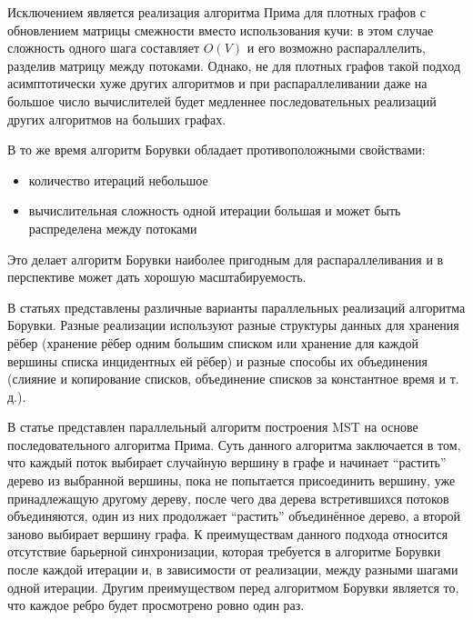 \documentclass[a4paper,10pt]{extarticle}
\begin{document}
Исключением является реализация алгоритма Прима для плотных графов с обновлением матрицы смежности вместо использования кучи: в этом случае сложность одного шага составляет $O(V)$ и его возможно распараллелить, разделив матрицу между потоками.
Однако, не для плотных графов такой подход асимптотически хуже других алгоритмов и при распараллеливании даже на большое число вычислителей будет медленнее последовательных реализаций других алгоритмов на больших графах.

В то же время алгоритм Борувки обладает противоположными свойствами:
\begin{itemize}
	\item количество итераций небольшое
	\item вычислительная сложность одной итерации большая и может быть распределена между потоками
\end{itemize}
Это делает алгоритм Борувки наиболее пригодным для распараллеливания и в перспективе может дать хорошую масштабируемость.

В статьях \cite{dense-mst,boruvka-prima,boruvka-cm5} представлены различные варианты параллельных реализаций алгоритма Борувки.
Разные реализации используют разные структуры данных для хранения рёбер (хранение рёбер одним большим списком или хранение для каждой вершины списка инцидентных ей рёбер) и разные способы их объединения (слияние и копирование списков, объединение списков за константное время и т. д.).

В статье \cite{boruvka-prima} представлен параллельный алгоритм построения MST на основе последовательного алгоритма Прима.
Суть данного алгоритма заключается в том, что каждый поток выбирает случайную вершину в графе и начинает ``растить'' дерево из выбранной вершины, пока не попытается присоединить вершину, уже принадлежащую другому дереву, после чего два дерева встретившихся потоков объединяются, один из них продолжает ``растить'' объединённое дерево, а второй заново выбирает вершину графа. %
К преимуществам данного подхода относится отсутствие барьерной синхронизации, которая требуется в алгоритме Борувки после каждой итерации и, в зависимости от реализации, между разными шагами одной итерации. Другим преимуществом перед алгоритмом Борувки является то, что каждое ребро будет просмотрено ровно один раз.
\end{document}
